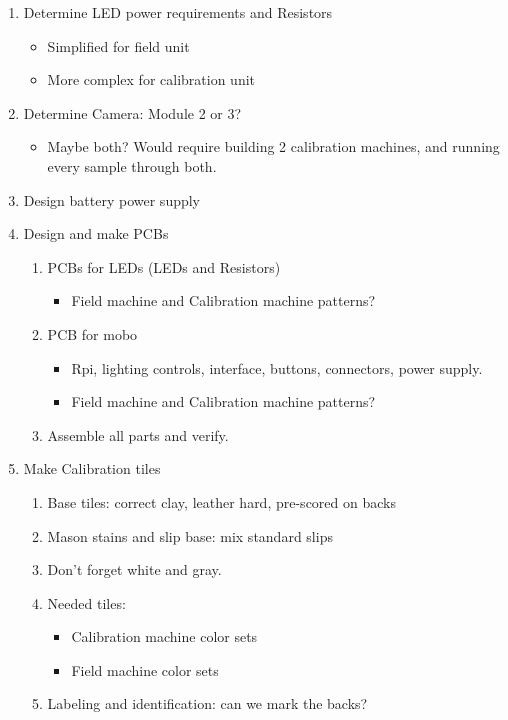 \documentclass{article}
\begin{document}
\begin{enumerate}[label=\arabic*.]
\item Determine LED power requirements and Resistors
\begin{itemize}
    \item Simplified for field unit
    \item More complex for calibration unit
\end{itemize}

\item Determine Camera: Module 2 or 3?
\begin{itemize}
    \item Maybe both? Would require building 2 calibration machines, and running every sample through both.
\end{itemize}

\item Design battery power supply

\item Design and make PCBs
\begin{enumerate}[label=\alph*)]
    \item PCBs for LEDs (LEDs and Resistors)
    \begin{itemize}
        \item Field machine and Calibration machine patterns?
    \end{itemize}
    \item PCB for mobo
    \begin{itemize}
        \item Rpi, lighting controls, interface, buttons, connectors, power supply.
        \item Field machine and Calibration machine patterns?
    \end{itemize}
    \item Assemble all parts and verify.
\end{enumerate}

\item Make Calibration tiles
\begin{enumerate}[label=\alph*)]
    \item Base tiles: correct clay, leather hard, pre-scored on backs
    \item Mason stains and slip base: mix standard slips
    \item Don't forget white and gray.
    \item Needed tiles:
    \begin{itemize}
        \item Calibration machine color sets
        \item Field machine color sets
    \end{itemize}
    \item Labeling and identification: can we mark the backs?
\end{enumerate}


\end{enumerate}
\end{document}
